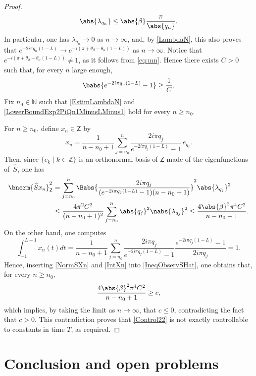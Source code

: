 \begin{proof}
\begin{equation}
\abs{\lambda_{q_n}} \leq \abs{\beta} \frac{\pi}{\abs{q_n}}.
\end{equation}
In particular, one has $\lambda_{q_n} \to 0$ as $n \to \infty$, and, by \eqref{LambdaN}, this also proves that $e^{- 2 i \pi q_n (1 - L)} \to e^{-i(\pi + \theta_\beta - \theta_\alpha(1 - L))}$ as $n \to \infty$. Notice that $e^{-i(\pi + \theta_\beta - \theta_\alpha(1 - L))} \neq 1$, as it follows from \eqref{eq:mn}. Hence there exists $C > 0$ such that, for every $n$ large enough,
\begin{equation}
\label{LowerBoundExp2PiQn1MinusLMinus1}
\babs{e^{- 2 i \pi q_n (1 - L)} - 1} \geq \frac{1}{C}.
\end{equation}
Fix $n_0 \in \mathbb N$ such that \eqref{EstimLambdaN} and \eqref{LowerBoundExp2PiQn1MinusLMinus1} hold for every $n \geq n_0$.

For $n \geq n_0$, define $x_n \in \mathsf Z$ by
\[
x_n = \frac{1}{n - n_0 + 1} \sum_{j = n_0}^n \frac{2 i \pi q_j}{e^{- 2 i \pi q_j (1 - L)} - 1}\, e_{q_j}.
\]
Then, since $\{e_k \mid k \in \mathbb Z\}$ is an orthonormal basis of $\mathsf Z$ made of the eigenfunctions of~$\widehat S$, one has
\begin{equation}
\label{NormSXn}
\begin{aligned}
\bnorm{\widehat S x_n}_{\mathsf Z}^2 & = \sum_{j = n_0}^n \Babs{\frac{2 i \pi q_j}{(e^{- 2 i \pi q_j (1 - L)} - 1)(n - n_0 + 1)}}^2 \abs{\lambda_{q_j}}^2 \\
& \leq \frac{4 \pi^2 C^2}{(n - n_0 + 1)^2} \sum_{j = n_0}^n \abs{q_j}^2 \nabs{\lambda_{q_j}}^2 \leq \frac{4 \abs{\beta}^2 \pi^4 C^2}{n - n_0 + 1}.
\end{aligned}
\end{equation}
On the other hand, one computes
\begin{equation}
\label{IntXn}
\int_{-1}^{L - 1} x_n(t) dt = \frac{1}{n - n_0 + 1} \sum_{j = n_0}^n \frac{2 i \pi q_j}{e^{- 2 i \pi q_j (1 - L)} - 1} \frac{e^{- 2 i \pi q_j (1 - L)} - 1}{2 i \pi q_j} = 1.
\end{equation}
Hence, inserting \eqref{NormSXn} and \eqref{IntXn} into \eqref{IneqObservSHat}, one obtains that, for every $n \geq n_0$,
\[
\frac{4 \abs{\beta}^2 \pi^4 C^2}{n - n_0 + 1} \geq c,
\]
which implies, by taking the limit as $n \to \infty$, that $c \leq 0$, contradicting the fact that $c > 0$. This contradiction proves that \eqref{Control22} is not exactly controllable to constants in time $T$, as required.
\end{proof}

\section{Conclusion and open problems}

